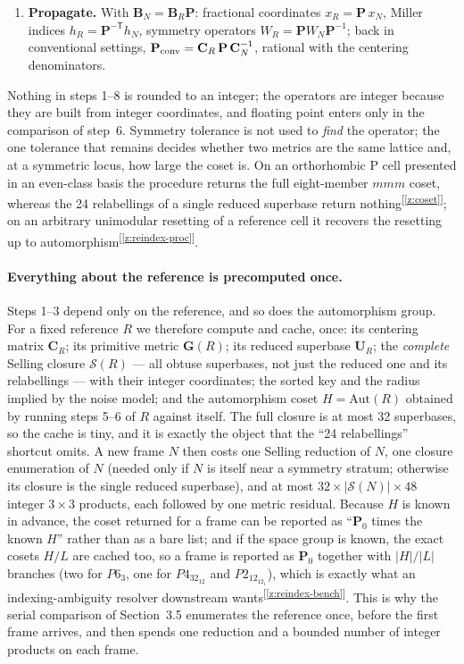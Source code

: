 \documentclass[11pt]{article}
\newcommand{\Gmet}{\mathbf{G}}
\newcommand{\Pop}{\mathbf{P}}
\newcommand{\Uop}{\mathbf{U}}
\newcommand{\Bbasis}{\mathbf{B}}
\newcommand{\Sclosure}{\mathcal{S}}
\newcommand{\chk}[1]{\textsuperscript{[\ref{#1}]}}
\begin{document}
\begin{enumerate}
\item \textbf{Propagate.} With $\Bbasis_N=\Bbasis_R\Pop$: fractional coordinates $x_R=\Pop\,x_N$, Miller indices $h_R=\Pop^{-\mathsf T}h_N$, symmetry operators $W_R=\Pop W_N\Pop^{-1}$; back in conventional settings, $\Pop_{\rm conv}=\mathbf C_R\,\Pop\,\mathbf C_N^{-1}$, rational with the centering denominators.
\end{enumerate}

Nothing in steps 1--8 is rounded to an integer; the operators are integer because they are built from integer coordinates, and floating point enters only in the comparison of step~6. Symmetry tolerance is not used to \emph{find} the operator; the one tolerance that remains decides whether two metrics are the same lattice and, at a symmetric locus, how large the coset is. On an orthorhombic P cell presented in an even-class basis the procedure returns the full eight-member $mmm$ coset, whereas the 24 relabellings of a single reduced superbase return nothing\chk{z:coset}; on an arbitrary unimodular resetting of a reference cell it recovers the resetting up to automorphism\chk{z:reindex-proc}.

\paragraph{Everything about the reference is precomputed once.}
Steps 1--3 depend only on the reference, and so does the automorphism group. For a fixed reference $R$ we therefore compute and cache, once: its centering matrix $\mathbf C_R$; its primitive metric $\Gmet(R)$; its reduced superbase $\Uop_R$; the \emph{complete} Selling closure $\Sclosure(R)$ --- all obtuse superbases, not just the reduced one and its relabellings --- with their integer coordinates; the sorted key and the radius implied by the noise model; and the automorphism coset $H=\mathrm{Aut}(R)$ obtained by running steps 5--6 of $R$ against itself. The full closure is at most 32 superbases, so the cache is tiny, and it is exactly the object that the ``24 relabellings'' shortcut omits. A new frame $N$ then costs one Selling reduction of $N$, one closure enumeration of $N$ (needed only if $N$ is itself near a symmetry stratum; otherwise its closure is the single reduced superbase), and at most $32\times|\Sclosure(N)|\times48$ integer $3\times3$ products, each followed by one metric residual. Because $H$ is known in advance, the coset returned for a frame can be reported as ``$\Pop_0$ times the known $H$'' rather than as a bare list; and if the space group is known, the exact cosets $H/L$ are cached too, so a frame is reported as $\Pop_0$ together with $|H|/|L|$ branches (two for $P6_3$, one for $P4_32_12$ and $P2_12_12_1$), which is exactly what an indexing-ambiguity resolver downstream wants\chk{z:reindex-bench}. This is why the serial comparison of Section~3.5 enumerates the reference once, before the first frame arrives, and then spends one reduction and a bounded number of integer products on each frame.
\end{document}
